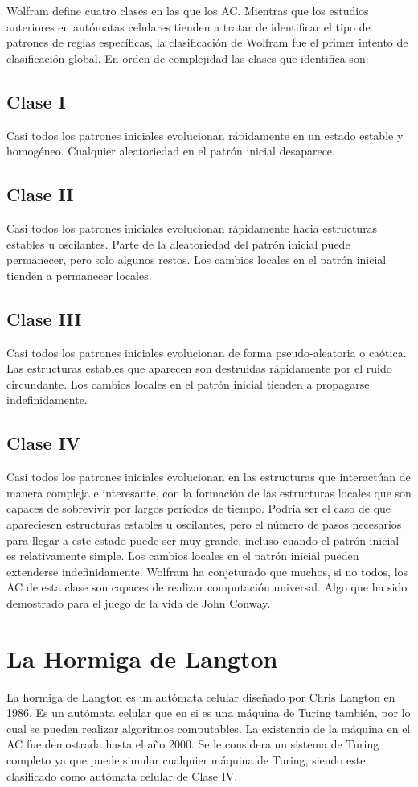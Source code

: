 \documentclass[10pt]{article}
\begin{document}
	Wolfram define cuatro clases en las que los AC. Mientras que los estudios anteriores en autómatas celulares tienden a tratar de identificar el tipo de patrones de reglas específicas, la clasificación de Wolfram fue el primer intento de clasificación global. En orden de complejidad las clases que identifica son:
		
		\subsection{Clase I}
		Casi todos los patrones iniciales evolucionan rápidamente en un estado estable y homogéneo. Cualquier aleatoriedad en el patrón inicial desaparece.
			
		\subsection{Clase II}
		Casi todos los patrones iniciales evolucionan rápidamente hacia estructuras estables u oscilantes. Parte de la aleatoriedad del patrón inicial puede permanecer, pero solo algunos restos. Los cambios locales en el patrón inicial tienden a permanecer locales.
			
		\subsection{Clase III} 
		Casi todos los patrones iniciales evolucionan de forma pseudo-aleatoria o caótica. Las estructuras estables que aparecen son destruidas rápidamente por el ruido circundante. Los cambios locales en el patrón inicial tienden a propagarse indefinidamente.
			
		\subsection{Clase IV}
		Casi todos los patrones iniciales evolucionan en las estructuras que interactúan de manera compleja e interesante, con la formación de las estructuras locales que son capaces de sobrevivir por largos períodos de tiempo. Podría ser el caso de que apareciesen estructuras estables u oscilantes, pero el número de pasos necesarios para llegar a este estado puede ser muy grande, incluso cuando el patrón inicial es relativamente simple. Los cambios locales en el patrón inicial pueden extenderse indefinidamente. Wolfram ha conjeturado que muchos, si no todos, los AC de esta clase son capaces de realizar computación universal. Algo que ha sido demostrado para el juego de la vida de John Conway.
    \section{La Hormiga de Langton}
        La hormiga de Langton es un autómata celular diseñado por Chris Langton en 1986. Es un autómata celular que en si es una máquina de Turing también, por lo cual se pueden realizar algoritmos computables. La existencia de la máquina en el AC fue demostrada hasta el año 2000. Se le considera un sistema de Turing completo ya que puede simular cualquier máquina de Turing, siendo este clasificado como autómata celular de Clase IV.
\end{document}
